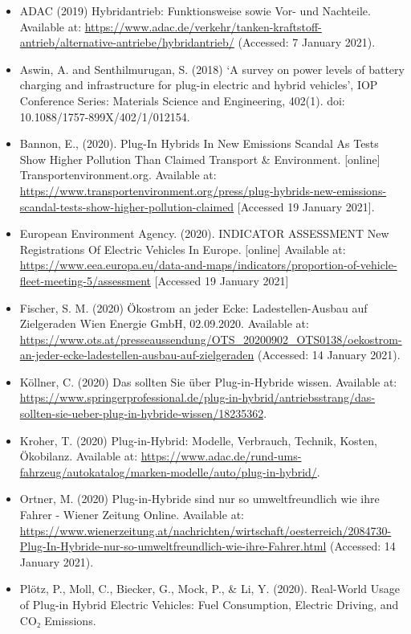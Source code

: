 \documentclass[
]{book}
\providecommand{\tightlist}{%
  \setlength{\itemsep}{0pt}\setlength{\parskip}{0pt}}
\begin{document}
\begin{itemize}
\tightlist
\item
  ADAC (2019) Hybridantrieb: Funktionsweise sowie Vor- und Nachteile. Available at: \url{https://www.adac.de/verkehr/tanken-kraftstoff-antrieb/alternative-antriebe/hybridantrieb/} (Accessed: 7 January 2021).
\item
  Aswin, A. and Senthilmurugan, S. (2018) `A survey on power levels of battery charging and infrastructure for plug-in electric and hybrid vehicles', IOP Conference Series: Materials Science and Engineering, 402(1). doi: 10.1088/1757-899X/402/1/012154.
\item
  Bannon, E., (2020). Plug-In Hybrids In New Emissions Scandal As Tests Show Higher Pollution Than Claimed \textbar{} Transport \& Environment. {[}online{]} Transportenvironment.org. Available at: \url{https://www.transportenvironment.org/press/plug-hybrids-new-emissions-scandal-tests-show-higher-pollution-claimed} {[}Accessed 19 January 2021{]}.
\item
  European Environment Agency. (2020). INDICATOR ASSESSMENT New Registrations Of Electric Vehicles In Europe. {[}online{]} Available at: \url{https://www.eea.europa.eu/data-and-maps/indicators/proportion-of-vehicle-fleet-meeting-5/assessment} {[}Accessed 19 January 2021{]}
\item
  Fischer, S. M. (2020) Ökostrom an jeder Ecke: Ladestellen-Ausbau auf Zielgeraden \textbar{} Wien Energie GmbH, 02.09.2020. Available at: \url{https://www.ots.at/presseaussendung/OTS_20200902_OTS0138/oekostrom-an-jeder-ecke-ladestellen-ausbau-auf-zielgeraden} (Accessed: 14 January 2021).
\item
  Köllner, C. (2020) Das sollten Sie über Plug-in-Hybride wissen. Available at: \url{https://www.springerprofessional.de/plug-in-hybrid/antriebsstrang/das-sollten-sie-ueber-plug-in-hybride-wissen/18235362}.
\item
  Kroher, T. (2020) Plug-in-Hybrid: Modelle, Verbrauch, Technik, Kosten, Ökobilanz. Available at: \url{https://www.adac.de/rund-ums-fahrzeug/autokatalog/marken-modelle/auto/plug-in-hybrid/}.
\item
  Ortner, M. (2020) Plug-in-Hybride sind nur so umweltfreundlich wie ihre Fahrer - Wiener Zeitung Online. Available at: \url{https://www.wienerzeitung.at/nachrichten/wirtschaft/oesterreich/2084730-Plug-In-Hybride-nur-so-umweltfreundlich-wie-ihre-Fahrer.html} (Accessed: 14 January 2021).
\item
  Plötz, P., Moll, C., Biecker, G., Mock, P., \& Li, Y. (2020). Real-World Usage of Plug-in Hybrid Electric Vehicles: Fuel Consumption, Electric Driving, and CO₂ Emissions.

\end{itemize}
\end{document}
